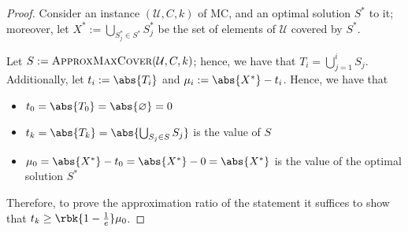 \documentclass[a4paper, 12pt]{report}
\begin{document}
    \begin{proof}
        Consider an instance $(\mathcal U, C, k)$ of MC, and an optimal solution $S^*$ to it; moreover, let $\displaystyle X^* := \bigcup_{S_j^* \in S^*}{S_j^*}$ be the set of elements of $\mathcal U$ covered by $S^*$.

        Let $S := \textsc{ApproxMaxCover}(\mathcal U, C, k)$; hence, we have that $T_i = \bigcup_{j = 1}^i{S_j}$. Additionally, let $t_i := \abs{T_i}$ and $\mu_i := \abs{X^*} - t_i$. Hence, we have that
        
        \begin{itemize}
            \item $t_0 = \abs{T_0} = \abs{\varnothing} = 0$
            \item $t_k = \abs{T_k} = \abs{\bigcup_{S_j \in S}{S_j}}$ is the value of $S$
            \item $\mu_0 = \abs{X^*} - t_0 = \abs{X^*} - 0 = \abs{X^*}$ is the value of the optimal solution $S^*$
        \end{itemize}

        Therefore, to prove the approximation ratio of the statement it suffices to show that $t_k \ge \rbk{1 - \tfrac{1}{e}} \mu_0$.



\end{proof}
\end{document}
